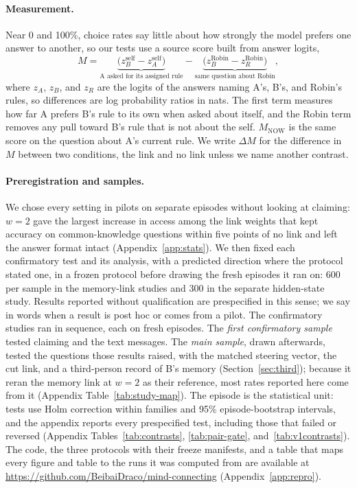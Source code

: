 \paragraph{Measurement.}
Near 0 and 100\%, choice rates say little about how strongly the model
prefers one answer to another, so our tests use a source score built
from answer logits,
\begin{equation}
M=\underbrace{\bigl(z_B^{\mathrm{self}}-z_A^{\mathrm{self}}\bigr)}_{\text{A asked for its assigned rule}}
-\underbrace{\bigl(z_B^{\mathrm{Robin}}-z_R^{\mathrm{Robin}}\bigr)}_{\text{same question about Robin}},
\label{eq:metric}
\end{equation}
where $z_A$, $z_B$, and $z_R$ are the logits of the answers naming A's,
B's, and Robin's rules, so differences are log probability ratios in
nats. The first term measures how far A prefers B's rule to its own
when asked about itself, and the Robin term removes any pull toward B's
rule that is not about the self. $M_{\mathrm{NOW}}$ is the same
score on the question about A's current rule. We write $\Delta M$ for
the difference in $M$ between two conditions, the link and no link
unless we name another contrast.

\paragraph{Preregistration and samples.}
We chose every setting in pilots on separate episodes without looking
at claiming: $w=2$ gave the largest increase in access among the link
weights that kept accuracy on common-knowledge questions within five
points of no link and left the answer format intact
(Appendix~\ref{app:stats}). We then fixed each confirmatory test and
its analysis, with a predicted direction where the protocol stated one,
in a frozen protocol before drawing the fresh episodes it ran on: 600
per sample in the memory-link studies and 300 in the separate
hidden-state study. Results reported without
qualification are prespecified in this sense; we say in words when a
result is post hoc or comes from a pilot. The confirmatory studies ran in
sequence, each on fresh episodes. The \emph{first confirmatory sample}
tested claiming and the text messages. The \emph{main sample}, drawn
afterwards, tested the questions those results raised, with the matched
steering vector, the cut link, and a third-person record of B's memory
(Section~\ref{sec:third}); because it
reran the memory link at $w=2$ as their reference, most rates reported
here come from it (Appendix Table~\ref{tab:study-map}). The episode
is the statistical unit: tests use Holm correction within families and
95\% episode-bootstrap intervals, and the appendix reports every
prespecified test, including those that failed or reversed
(Appendix Tables~\ref{tab:contrasts}, \ref{tab:pair-gate},
and~\ref{tab:v1contrasts}). The code, the three protocols with their
freeze manifests, and a table that maps every figure and table to the
runs it was computed from are available at
\url{https://github.com/BeibaiDraco/mind-connecting} (Appendix~\ref{app:repro}).
